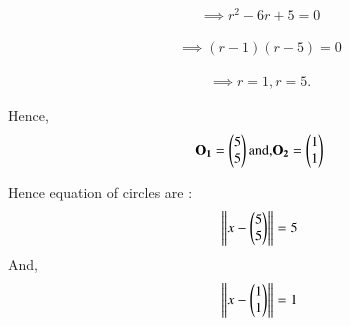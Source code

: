 \documentclass[journal,12pt,twocolumn]{IEEEtran}
\begin{document}
\begin{align}
\implies r^2 - 6r +5 = 0
\end{align}


\begin{align}
\implies \left( r -1\right) \left( r- 5\right) = 0
\end{align}

\begin{align}
\implies r = 1, r = 5.
\end{align}












%
%
%
%

Hence,
\begin{align}
\mathbf{O_1} = \begin{pmatrix}5 \\ 5 \\\end{pmatrix} \text{and,}  \mathbf{O_2} = \begin{pmatrix}1 \\ 1 \\\end{pmatrix}
\end{align}

Hence equation of circles are :
\begin{align}
\left\lVert x - \begin{pmatrix}5 \\ 5 \\\end{pmatrix}\right\rVert = 5
\end{align}
And,
\begin{align}
\left\lVert x - \begin{pmatrix}1 \\ 1 \\\end{pmatrix}\right\rVert = 1
\end{align}
\end{document}
